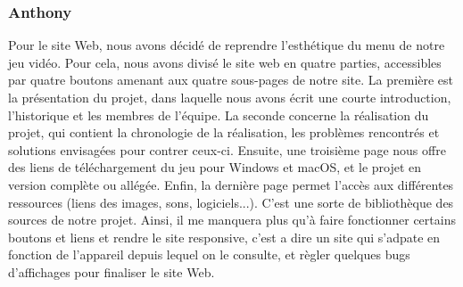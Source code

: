 \documentclass[a4paper,12pt]{article}
\begin{document}
    \subsubsection{Anthony}
        Pour le site Web, nous avons décidé de reprendre l'esthétique du
        menu de notre jeu vidéo. Pour cela, nous avons divisé le site web 
        en quatre parties, accessibles par quatre boutons amenant aux quatre 
        sous-pages de notre site. La première est la présentation du projet, dans laquelle
        nous avons écrit une courte introduction, l'historique et les membres
        de l'équipe. La seconde concerne la réalisation du projet, qui contient
        la chronologie de la réalisation, les problèmes rencontrés et solutions
        envisagées pour contrer ceux-ci. Ensuite, une troisième page nous 
        offre des liens de téléchargement du jeu pour Windows et macOS, et
        le projet en version complète ou allégée.
        Enfin, la dernière page permet l'accès aux différentes ressources
        (liens des images, sons, logiciels...). C'est une sorte de bibliothèque 
        des sources de notre projet.
        Ainsi, il me manquera plus qu'à faire fonctionner certains boutons et 
        liens et rendre le site responsive, c'est a dire un site qui s'adpate en 
        fonction de l'appareil depuis lequel on le consulte, et 
        règler quelques bugs d'affichages pour finaliser le site Web. 
\end{document}
